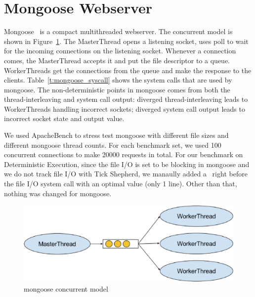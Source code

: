 \section{Mongoose Webserver}

Mongoose~\cite{mongoose} is a compact multithreaded webserver. The concurrent model is shown in Figure~\ref{f:mongoose_model}. The MasterThread opens a listening socket, uses poll to wait for the incoming connections on the listening socket. Whenever a connection comes, the MasterThread accepts it and put the file descriptor to a queue. WorkerThreads get the connections from the queue and make the response to the clients. Table~\ref{t:mongoose_syscall} shows the system calls that are used by mongoose. The non-deterministic points in mongoose comes from both the thread-interleaving and system call output: diverged thread-interleaving leads to WorkerThreads handling incorrect sockets; diverged system call output leads to incorrect socket state and output value.

We used ApacheBench to stress test mongoose with different file sizes and different mongoose thread counts. For each benchmark set, we used 100 concurrent connections to make 20000 requests in total. For our benchmark on Deterministic Execution, since the file I/O is set to be blocking in mongoose and we do not track file I/O with Tick Shepherd, we manaully added a \dettick\ right before the file I/O system call with an optimal value (only 1 line). Other than that, nothing was changed for mongoose.

\begin{figure}
\centering
\includegraphics[width=0.6\columnwidth]{figures/mongoose_model}
\caption{mongoose concurrent model}
\label{f:mongoose_model}
\end{figure}


